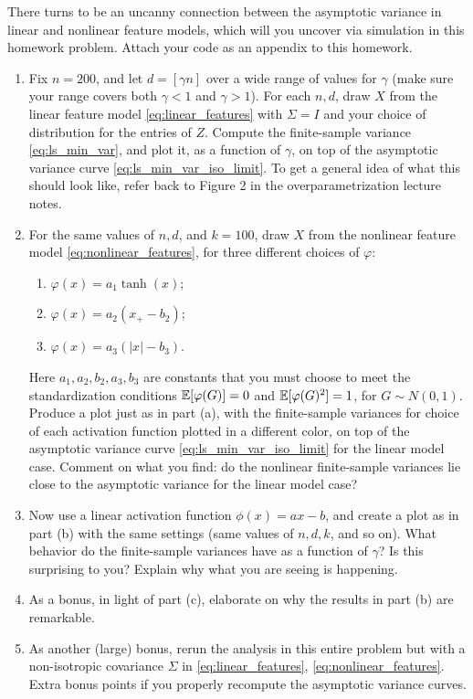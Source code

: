 \documentclass{article}
\begin{document}
There turns to be an uncanny connection between the asymptotic variance in
linear and nonlinear feature models, which will you uncover via simulation in
this homework problem. Attach your code as an appendix to this homework. 

\begin{enumerate}[label=(\alph*)]
\item Fix $n=200$, and let $d=[\gamma n]$ over a wide range of values for
  $\gamma$ (make sure your range covers both $\gamma<1$ and $\gamma>1$). For
  each $n,d$, draw $X$ from the linear feature model \eqref{eq:linear_features}
  with $\Sigma=I$ and your choice of distribution for the entries of
  $Z$. Compute the finite-sample variance \eqref{eq:ls_min_var}, and plot it, as
  a function of $\gamma$, on top of the asymptotic variance curve  
  \eqref{eq:ls_min_var_iso_limit}. To get a general idea of what this should
  look like, refer back to Figure 2 in the overparametrization lecture notes.     
  \marginpar{\small [3 pts]}

\item For the same values of $n,d$, and $k=100$, draw $X$ from the nonlinear
  feature model \eqref{eq:nonlinear_features}, for three different choices of
  $\varphi$:   
  \begin{enumerate}[label=\roman*.]
  \item $\varphi(x) = a_1\tanh(x)$;
  \item $\varphi(x) = a_2(x_+-b_2)$;
  \item $\varphi(x) = a_3(|x|-b_3)$.
  \end{enumerate}
  Here $a_1,a_2,b_2,a_3,b_3$ are constants that you must choose to meet the 
  standardization conditions $\mathbb{E}[\varphi(G)]=0$ and $\mathbb{E}[\varphi(G)^2]=1$, for 
  $G \sim N(0,1)$. Produce a plot just as in part (a), with the finite-sample
  variances for choice of each activation function plotted in a different color,
  on top of the asymptotic variance curve \eqref{eq:ls_min_var_iso_limit} for
  the linear model case. Comment on what you find: do the nonlinear
  finite-sample variances lie close to the asymptotic variance for the linear
  model case?  
  \marginpar{\small [9 pts]}

\item Now use a linear activation function $\phi(x) = ax-b$, and create a plot
  as in part (b) with the same settings (same values of $n,d,k$, and so
  on). What behavior do the finite-sample variances have as a function of 
  $\gamma$? Is this surprising to you? Explain why what you are seeing is
  happening. 
 \marginpar{\small [3 pts]}

\item As a bonus, in light of part (c), elaborate on why the results in part (b)
  are remarkable. 

\item As another (large) bonus, rerun the analysis in this entire problem but
  with a non-isotropic covariance $\Sigma$ in \eqref{eq:linear_features},
  \eqref{eq:nonlinear_features}. Extra bonus points if you properly recompute
  the asymptotic variance curves. 
\end{enumerate}
\end{document}

